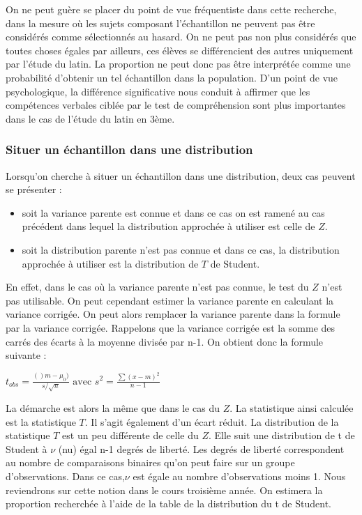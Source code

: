 \documentclass[]{book}
\providecommand{\tightlist}{%
  \setlength{\itemsep}{0pt}\setlength{\parskip}{0pt}}
\theoremstyle{definition}
\theoremstyle{definition}
\theoremstyle{definition}
\theoremstyle{remark}
\begin{document}
On ne peut guère se placer du point de vue fréquentiste dans cette
recherche, dans la mesure où les sujets composant l'échantillon ne
peuvent pas être considérés comme sélectionnés au hasard. On ne peut pas
non plus considérés que toutes choses égales par ailleurs, ces élèves se
différencient des autres uniquement par l'étude du latin. La proportion
ne peut donc pas être interprétée comme une probabilité d'obtenir un tel
échantillon dans la population. D'un point de vue psychologique, la
différence significative nous conduit à affirmer que les compétences
verbales ciblée par le test de compréhension sont plus importantes dans
le cas de l'étude du latin en 3ème.

\hypertarget{situer-un-echantillon-dans-une-distribution}{%
\subsubsection{Situer un échantillon dans une
distribution}\label{situer-un-echantillon-dans-une-distribution}}

Lorsqu'on cherche à situer un échantillon dans une distribution, deux
cas peuvent se présenter :

\begin{itemize}
\tightlist
\item
  soit la variance parente est connue et dans ce cas on est ramené au
  cas précédent dans lequel la distribution approchée à utiliser est
  celle de \(Z\).
\item
  soit la distribution parente n'est pas connue et dans ce cas, la
  distribution approchée à utiliser est la distribution de \(T\) de
  Student.
\end{itemize}

En effet, dans le cas où la variance parente n'est pas connue, le test
du \(Z\) n'est pas utilisable. On peut cependant estimer la variance
parente en calculant la variance corrigée. On peut alors remplacer la
variance parente dans la formule par la variance corrigée. Rappelons que
la variance corrigée est la somme des carrés des écarts à la moyenne
divisée par n-1. On obtient donc la formule suivante :

\(t_{obs}=\frac{()m-\mu _{0})}{s/\sqrt{n}} \textrm { avec } s^{2}=\frac{\sum (x-m)^{2}}{n-1}\)

La démarche est alors la même que dans le cas du \(Z\). La statistique
ainsi calculée est la statistique \(T\). Il s'agit également d'un écart
réduit. La distribution de la statistique \(T\) est un peu différente de
celle du \(Z\). Elle suit une distribution de t de Student à \(\nu\)
(nu) égal n-1 degrés de liberté. Les degrés de liberté correspondent au
nombre de comparaisons binaires qu'on peut faire sur un groupe
d'observations. Dans ce cas,\(\nu\) est égale au nombre d'observations
moins 1. Nous reviendrons sur cette notion dans le cours troisième
année. On estimera la proportion recherchée à l'aide de la table de la
distribution du t de Student.
\end{document}
